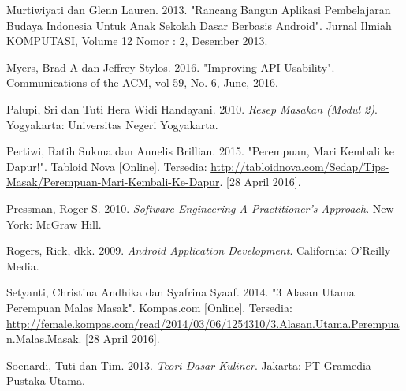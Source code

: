 \documentclass{jtetiskripsi}
\begin{document}
\begin{thebibliography}{99}
	 Murtiwiyati dan Glenn Lauren. 2013. "Rancang Bangun Aplikasi Pembelajaran Budaya Indonesia Untuk Anak Sekolah Dasar Berbasis Android". Jurnal Ilmiah KOMPUTASI, Volume 12 Nomor : 2, Desember 2013.	

	 Myers, Brad A dan Jeffrey Stylos. 2016. "Improving API Usability". Communications of the ACM, vol 59, No. 6, June, 2016.		
	
	Palupi, Sri dan Tuti Hera Widi Handayani. 2010. \textit{Resep Masakan (Modul 2)}. Yogyakarta: Universitas Negeri Yogyakarta.	
	
	 Pertiwi, Ratih Sukma dan Annelis Brillian.  2015. "Perempuan, Mari Kembali ke Dapur!".  Tabloid Nova [Online]. Tersedia: \url{http://tabloidnova.com/Sedap/Tips-Masak/Perempuan-Mari-Kembali-Ke-Dapur}. [28 April 2016].	
	
	Pressman, Roger S. 2010. \textit{Software Engineering A Practitioner's Approach}. New York: McGraw Hill.	
		
	Rogers, Rick, dkk. 2009. \textit{Android Application Development}. California: O'Reilly Media.	
	
	 Setyanti, Christina Andhika dan Syafrina Syaaf.  2014. "3 Alasan Utama Perempuan Malas Masak".  Kompas.com [Online]. Tersedia: \url{http://female.kompas.com/read/2014/03/06/1254310/3.Alasan.Utama.Perempuan.Malas.Masak}. [28 April 2016].
	
	Soenardi, Tuti dan Tim. 2013. \textit{Teori Dasar Kuliner}. Jakarta: PT Gramedia Pustaka Utama.	
		
	
\end{thebibliography}

%

%
\end{document}
